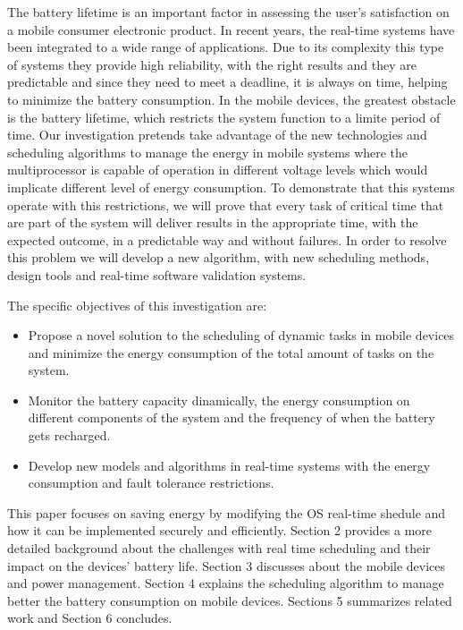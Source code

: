 \documentclass[conference]{IEEEtran}
\begin{document}
The battery lifetime is an important factor in assessing the user’s satisfaction on a mobile consumer electronic product. In recent years, the real-time systems have been integrated to a wide range of applications. Due to its complexity this type of systems they provide high reliability, with the right results and they are predictable and since they need to meet a deadline, it is always on time, helping to minimize the battery consumption.
In the mobile devices, the greatest obstacle is the battery lifetime, which restricts the system function to a limite period of time. 
Our investigation pretends take advantage of the new technologies and scheduling algorithms to manage the energy in mobile systems where the multiprocessor is capable of operation in different voltage levels which would implicate different level of energy consumption.
To demonstrate that this systems operate with this restrictions, we will prove that every task of critical time that are part of the system will deliver results in the appropriate time, with the expected outcome, in a predictable way and without failures. 
In order to resolve this problem we will develop a new algorithm, with new scheduling methods, design tools and real-time software validation systems.

The specific objectives of this investigation are:
\begin{itemize}
\item Propose a novel solution to the scheduling of dynamic tasks in mobile devices and minimize the energy consumption of the total amount of tasks on the system.
\item Monitor the battery capacity dinamically, the energy consumption on different components of the system and the frequency of when the battery gets recharged.
\item Develop new models and algorithms in real-time systems with the energy consumption and fault tolerance restrictions.
\end{itemize}


This paper focuses on saving energy by modifying the OS real-time shedule and how it can be implemented securely and efficiently. 
Section 2 provides a more detailed background about the challenges with real time scheduling and their impact on the devices' battery life. Section 3 discusses about the mobile devices and power management. Section 4 explains the scheduling algorithm to manage better the battery consumption on mobile devices. Sections 5 summarizes related work and Section 6 concludes.
\end{document}
